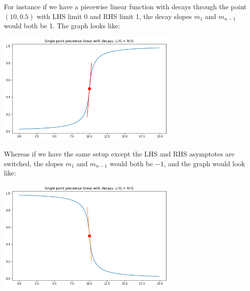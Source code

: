 \documentclass[10pt]{article}
\begin{document}
For instance if we have a piecewise linear function with decays 
through the point $(10,0.5)$ with LHS limit 0 and RHS limit 1, the decay slopes
$m_1$ and $m_{n-1}$ would both be 1.  The graph looks like:
\begin{center}
	\includegraphics[width=3.5in]{graph4}
\end{center}

Whereas if we have the same setup except the LHS and RHS asymptotes are switched, the
slopes $m_1$ and $m_{n-1}$ would both be $-1$, and the graph would look like:

\begin{center}
	\includegraphics[width=3.5in]{graph5}
\end{center}
%
%
\end{document}
